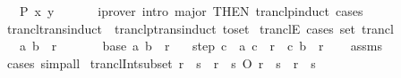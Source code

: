 \begin{isabellebody}
\ \ \ {\isachardoublequoteopen}P\ x\ y{\isachardoublequoteclose}\isanewline
\ \ %
\isanewline
%
\isadelimproof
\ \ %
\endisadelimproof
%
\isatagproof
{}\isamarkupfalse%
\ {\isacharparenleft}{\kern0pt}iprover\ intro{\isacharcolon}{\kern0pt}\ major\ {\isacharbrackleft}{\kern0pt}THEN\ tranclp{\isacharunderscore}{\kern0pt}induct{\isacharbrackright}{\kern0pt}\ cases{\isacharparenright}{\kern0pt}%
\endisatagproof
{\isafoldproof}%
%
\isadelimproof
\isanewline
%
\endisadelimproof
\isanewline
{}\isamarkupfalse%
\ trancl{\isacharunderscore}{\kern0pt}trans{\isacharunderscore}{\kern0pt}induct\ {\isacharequal}{\kern0pt}\ tranclp{\isacharunderscore}{\kern0pt}trans{\isacharunderscore}{\kern0pt}induct\ {\isacharbrackleft}{\kern0pt}to{\isacharunderscore}{\kern0pt}set{\isacharbrackright}{\kern0pt}\isanewline
\isanewline
{}\isamarkupfalse%
\ tranclE\ {\isacharbrackleft}{\kern0pt}cases\ set{\isacharcolon}{\kern0pt}\ trancl{\isacharbrackright}{\kern0pt}{\isacharcolon}{\kern0pt}\isanewline
\ \ \ {\isachardoublequoteopen}{\isacharparenleft}{\kern0pt}a{\isacharcomma}{\kern0pt}\ b{\isacharparenright}{\kern0pt}\ {\isasymin}\ r\isactrlsup {\isacharplus}{\kern0pt}{\isachardoublequoteclose}\isanewline
\ \ \isanewline
\ \ \ \ {\isacharparenleft}{\kern0pt}base{\isacharparenright}{\kern0pt}\ {\isachardoublequoteopen}{\isacharparenleft}{\kern0pt}a{\isacharcomma}{\kern0pt}\ b{\isacharparenright}{\kern0pt}\ {\isasymin}\ r{\isachardoublequoteclose}\isanewline
\ \ {\isacharbar}{\kern0pt}\ {\isacharparenleft}{\kern0pt}step{\isacharparenright}{\kern0pt}\ c\ \ {\isachardoublequoteopen}{\isacharparenleft}{\kern0pt}a{\isacharcomma}{\kern0pt}\ c{\isacharparenright}{\kern0pt}\ {\isasymin}\ r\isactrlsup {\isacharplus}{\kern0pt}{\isachardoublequoteclose}\ \ {\isachardoublequoteopen}{\isacharparenleft}{\kern0pt}c{\isacharcomma}{\kern0pt}\ b{\isacharparenright}{\kern0pt}\ {\isasymin}\ r{\isachardoublequoteclose}\isanewline
%
\isadelimproof
\ \ %
\endisadelimproof
%
\isatagproof
{}\isamarkupfalse%
\ assms\ \isamarkupfalse%
\ cases\ simp{\isacharunderscore}{\kern0pt}all%
\endisatagproof
{\isafoldproof}%
%
\isadelimproof
\isanewline
%
\endisadelimproof
\isanewline
{}\isamarkupfalse%
\ trancl{\isacharunderscore}{\kern0pt}Int{\isacharunderscore}{\kern0pt}subset{\isacharcolon}{\kern0pt}\ {\isachardoublequoteopen}r\ {\isasymsubseteq}\ s\ {\isasymLongrightarrow}\ {\isacharparenleft}{\kern0pt}r\isactrlsup {\isacharplus}{\kern0pt}\ {\isasyminter}\ s{\isacharparenright}{\kern0pt}\ O\ r\ {\isasymsubseteq}\ s\ {\isasymLongrightarrow}\ r\isactrlsup {\isacharplus}{\kern0pt}\ {\isasymsubseteq}\ s{\isachardoublequoteclose}\isanewline

\end{isabellebody}

